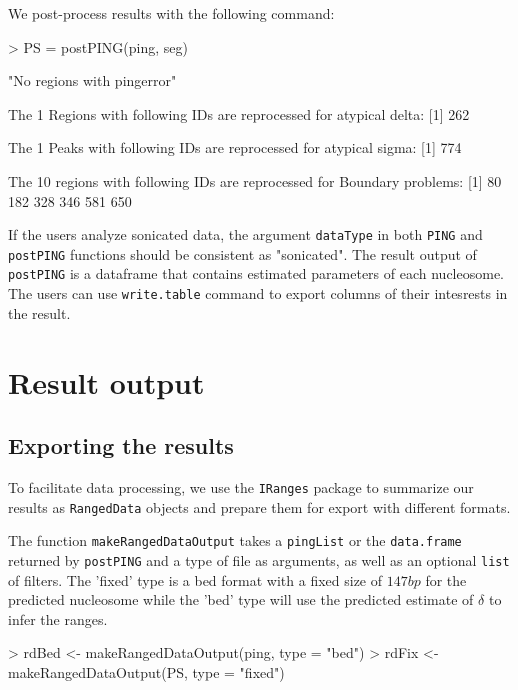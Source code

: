 \documentclass[11pt]{article}
\begin{document}
We post-process results with the following command:


\begin{Schunk}
\begin{Sinput}
> PS = postPING(ping, seg)
\end{Sinput}
\begin{Soutput}
[1] "No regions with pingerror"

 The 1 Regions with following IDs are reprocessed for atypical delta: 
[1] 262

 The 1 Peaks with following IDs are reprocessed for atypical sigma: 
[1] 774

 The 10 regions with following IDs are reprocessed for Boundary problems: 
[1]  80 182 328 346 581 650
\end{Soutput}
\end{Schunk}
If the users analyze sonicated data, the argument \texttt{dataType} in both \texttt{PING} and \texttt{postPING} functions should be consistent as "sonicated".
The result output of \texttt{postPING} is a dataframe that contains estimated parameters of each nucleosome. The users can use \texttt{write.table} command to export columns of their intesrests in the result. 



\section{Result output}

\subsection{Exporting the results}
To facilitate data processing, we use the \texttt{IRanges} package to summarize our results as \texttt{RangedData} objects and prepare them for export with different formats.


The function \texttt{makeRangedDataOutput} takes a \texttt{pingList} or the \texttt{data.frame} returned by \texttt{postPING} and a type of file as arguments, as well as an optional \texttt{list} of filters. The 'fixed' type is a bed format with a fixed size of $147bp$ for the predicted nucleosome while the 'bed' type will use the predicted estimate of $\delta$ to infer the ranges.
\begin{Schunk}
\begin{Sinput}
> rdBed <- makeRangedDataOutput(ping, type = "bed")
> rdFix <- makeRangedDataOutput(PS, type = "fixed")
\end{Sinput}
\end{Schunk}
\end{document}
